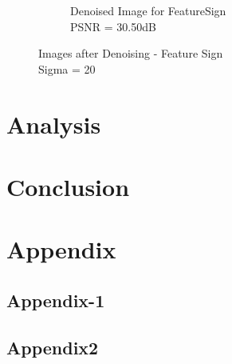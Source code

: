 \documentclass{article} %
\begin{document}
\begin{figure}[h]
\begin{subfigure}[b]{0.5\textwidth}
                \caption{Denoised Image for FeatureSign\\PSNR = 30.50dB}
                \label{fig:DenoisedFeatureSign}
        \end{subfigure}
        \caption{Images after Denoising - Feature Sign\\Sigma = 20}\label{fig:DenoiseFeatureSign}
\end{figure}

\vspace{.2cm}
\section{Analysis}
\vspace{.2cm}

\vspace{.2cm}
\section{Conclusion}
\vspace{.2cm}


\nocite{*}



\newpage
\section{Appendix}


\subsection{Appendix-1}
\label{sec:Appendix1}
 

\subsection{Appendix2}
\label{Appendix2}
\end{document}

